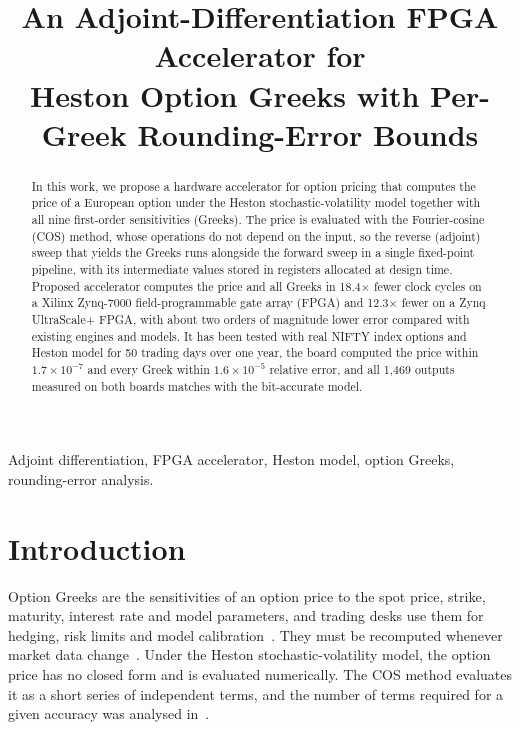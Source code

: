 \documentclass[conference]{IEEEtran}
\begin{document}
\title{An Adjoint-Differentiation FPGA Accelerator for\\ Heston Option Greeks with Per-Greek Rounding-Error Bounds}

\author{
}

\maketitle

\begin{abstract}
In this work, we propose a hardware accelerator for option pricing that computes the price of a European option under the Heston stochastic-volatility model together with all nine first-order sensitivities (Greeks). The price is evaluated with the Fourier-cosine (COS) method, whose operations do not depend on the input, so the reverse (adjoint) sweep that yields the Greeks runs alongside the forward sweep in a single fixed-point pipeline, with its intermediate values stored in registers allocated at design time. Proposed accelerator computes the price and all Greeks in 18.4$\times$ fewer clock cycles on a Xilinx Zynq-7000 field-programmable gate array (FPGA) and 12.3$\times$ fewer on a Zynq UltraScale+ FPGA, with about two orders of magnitude lower error compared with existing engines and models. It has been tested with real NIFTY index options and Heston model for 50 trading days over one year, the board computed the price within $1.7\times10^{-7}$ and every Greek within $1.6\times10^{-5}$ relative error, and all 1,469 outputs measured on both boards matches with the bit-accurate model.
\end{abstract}

\begin{IEEEkeywords}
Adjoint differentiation, FPGA accelerator, Heston model, option Greeks, rounding-error analysis.
\end{IEEEkeywords}

\section{Introduction}
Option Greeks are the sensitivities of an option price to the spot price, strike, maturity,
interest rate and model parameters, and trading desks use them for hedging, risk limits and model
calibration~\cite{capgiles24}. They must be recomputed whenever market data change~\cite{klai}. Under the
Heston stochastic-volatility model, the option price has no closed form and is
evaluated numerically. The COS method evaluates it as a short series of independent
terms, and the number of terms required for a given accuracy was analysed in~\cite{junike24}.
\end{document}

